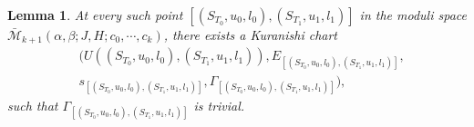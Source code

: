 \documentclass{amsart}
\newtheorem{lemma}[theorem]{Lemma}
\numberwithin{equation}{section}
\numberwithin{figure}{section}
\begin{document}
\begin{lemma}
	At every such point $[(S_{T_{0}}, u_{0}, l_{0}), (S_{T_{1}}, u_{1}, l_{1})]$ in the moduli space $\bar{\mathcal{M}}_{k+1}(\alpha, \beta; J, H; c_{0}, \cdots, c_{k})$, there exists a Kuranishi chart 
\begin{equation*}
\begin{split}
&(U((S_{T_{0}}, u_{0}, l_{0}), (S_{T_{1}}, u_{1}, l_{1})), E_{[(S_{T_{0}}, u_{0}, l_{0}), (S_{T_{1}}, u_{1}, l_{1})]},\\
&s_{[(S_{T_{0}}, u_{0}, l_{0}), (S_{T_{1}}, u_{1}, l_{1})]}, \Gamma_{[(S_{T_{0}}, u_{0}, l_{0}), (S_{T_{1}}, u_{1}, l_{1})]}),
\end{split}
\end{equation*}
such that $\Gamma_{[(S_{T_{0}}, u_{0}, l_{0}), (S_{T_{1}}, u_{1}, l_{1})]}$ is trivial.
\end{lemma}
\end{document}
